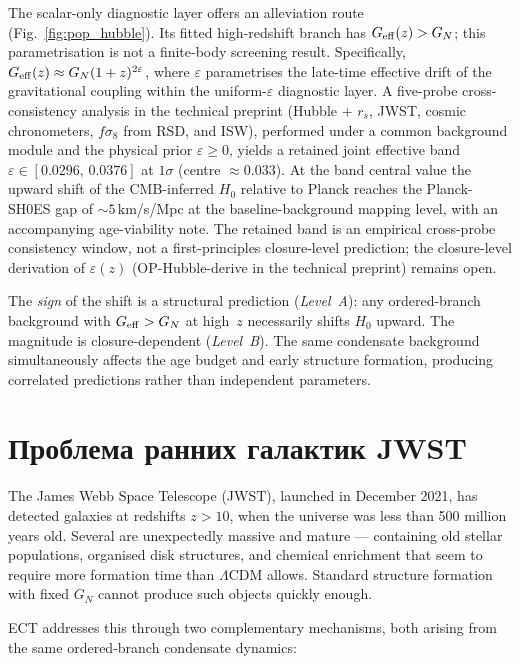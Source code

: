 \documentclass[11pt,a4paper]{article}
\begin{document}
The scalar-only diagnostic layer offers an alleviation route (Fig.~\ref{fig:pop_hubble}).  Its fitted high-redshift branch has $G_{\rm eff}(z)>G_N$; this parametrisation is not a finite-body screening result. Specifically, $G_{\rm eff}(z) \approx G_N(1+z)^{2\varepsilon}$, where $\varepsilon$ parametrises the late-time effective drift of the gravitational coupling within the uniform-$\varepsilon$ diagnostic layer. A five-probe cross-consistency analysis in the technical preprint (Hubble + $r_s$, JWST, cosmic chronometers, $f\sigma_8$ from RSD, and ISW), performed under a common background module and the physical prior $\varepsilon \geq 0$, yields a retained joint effective band $\varepsilon \in [0.0296,\,0.0376]$ at $1\sigma$ (centre $\approx 0.033$). At the band central value the upward shift of the CMB-inferred $H_0$ relative to Planck reaches the Planck-SH0ES gap of $\sim 5$\,km/s/Mpc at the baseline-background mapping level, with an accompanying age-viability note. The retained band is an empirical cross-probe consistency window, not a first-principles closure-level prediction; the closure-level derivation of $\varepsilon(z)$ (OP-Hubble-derive in the technical preprint) remains open.

The \emph{sign} of the shift is a structural prediction (\emph{Level~A}): any ordered-branch background with $G_{\rm eff} > G_N$ at high~$z$ necessarily shifts $H_0$ upward. The magnitude is closure-dependent (\emph{Level~B}). The same condensate background simultaneously affects the age budget and early structure formation, producing correlated predictions rather than independent parameters.


\section{Проблема ранних галактик JWST}
\label{sec:pop_jwst}

The James Webb Space Telescope (JWST), launched in December 2021, has detected galaxies at redshifts $z > 10$, when the universe was less than 500 million years old. Several are unexpectedly massive and mature --- containing old stellar populations, organised disk structures, and chemical enrichment that seem to require more formation time than $\Lambda$CDM allows. Standard structure formation with fixed $G_N$ cannot produce such objects quickly enough.

ECT addresses this through two complementary mechanisms, both arising from the same ordered-branch condensate dynamics:
\end{document}
